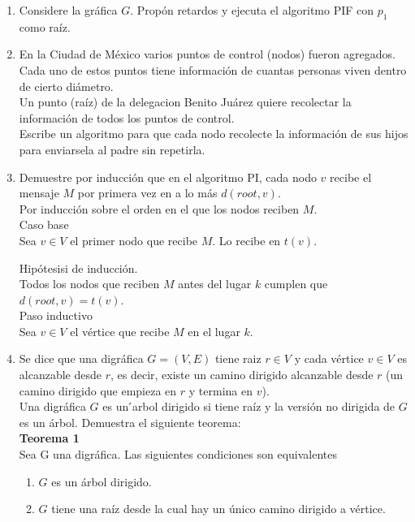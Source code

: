 \documentclass[12pt,a4paper]{report}
\begin{document}
	\begin{enumerate}
		\item {
			Considere la gráfica $G$. Propón retardos y ejecuta el algoritmo PIF con
			$p_1$ como raíz.\\
		}

		\item {
			En la Ciudad de México varios puntos de control (nodos) fueron agregados.\\
			Cada uno de estos puntos tiene información de cuantas personas viven
			dentro de cierto diámetro. \\
			Un punto (raíz) de la delegacion Benito Juárez quiere recolectar la
			información de todos los puntos de control. \\
			Escribe un algoritmo para que cada nodo recolecte la información de sus
			hijos para enviarsela al padre sin repetirla.\\
			}

		\item{
			Demuestre por inducción que en el algoritmo PI, cada nodo $v$ recibe el
			mensaje $M$ por primera vez en a lo más $d(root, v)$.\\

			Por inducción sobre el orden en el que los nodos reciben $M$.\\
			Caso base\\
			Sea $v \in V$ el primer nodo que recibe $M$. Lo recibe en $t(v)$.

			Hipótesisi de inducción.\\
			Todos los nodos que reciben $M$ antes del lugar $k$ cumplen que
			$d(root, v) = t(v)$.\\

			Paso inductivo\\
			Sea $v \in V$ el vértice que recibe $M$ en el lugar $k$.

		}
		\item{
			Se dice que una digráfica $G = (V, E)$ tiene raiz $r \in V$ y cada
			vértice $v \in V$ es alcanzable desde $r$, es decir, existe un camino
			dirigido alcanzable desde $r$ (un camino dirigido que empieza en $r$ y
			termina en $v$).\\
			Una digráfica $G$ es un  ́arbol dirigido si tiene raíz y la versión no dirigida
			de $G$ es un árbol. Demuestra el siguiente teorema:\\

			\textbf{Teorema 1}\\
			Sea G una digráfica. Las siguientes condiciones son equivalentes
			\begin{enumerate} [label = \alph*)]
				\item {
					$G$ es un árbol dirigido.\\
				}
				\item {
					$G$ tiene una raíz desde la cual hay un único camino dirigido a
					vértice.\\
				}


\end{enumerate}}
\end{enumerate}
\end{document}

